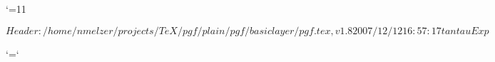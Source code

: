 %
%
%


\edef\pgfatcode{\the\catcode`\@}
\catcode`\@=11



\ProvidesPackageRCS $Header: /home/nmelzer/projects/TeX/pgf/plain/pgf/basiclayer/pgf.tex,v 1.8 2007/12/12 16:57:17 tantau Exp $











\catcode`\@=\pgfatcode

\endinput
